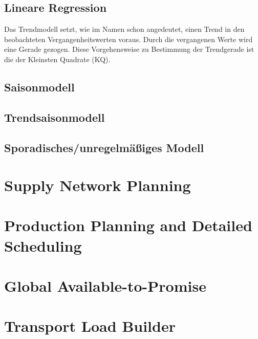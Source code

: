 \subsection{Lineare Regression}
Das Trendmodell setzt, wie im Namen schon angedeutet, einen Trend in den beobachteten Vergangenheitswerten voraus. Durch die vergangenen Werte wird eine Gerade gezogen. Diese Vorgehensweise zu Bestimmung der Trendgerade ist die der Kleinsten Quadrate (KQ).



\subsection{Saisonmodell}

\subsection{Trendsaisonmodell}
\subsection{Sporadisches/unregelmäßiges Modell}

\section{Supply Network Planning}
\cite[S.~169~ff]{Witt:2014:GrundkursSAPAPO}
\section{Production Planning and Detailed Scheduling}
\section{Global Available-to-Promise}
\section{Transport Load Builder}
